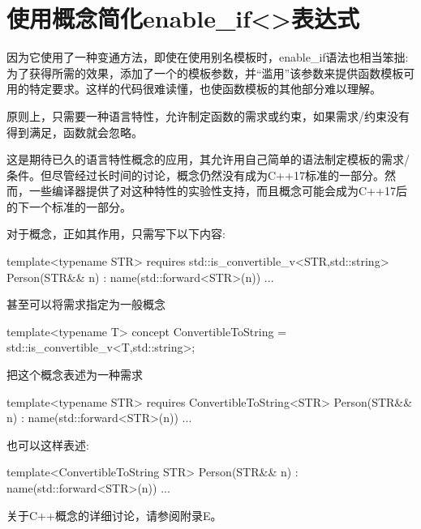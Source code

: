 \section{使用概念简化enable\_if<>表达式}
因为它使用了一种变通方法，即使在使用别名模板时，enable\_if语法也相当笨拙:为了获得所需的效果，添加了一个的模板参数，并“滥用”该参数来提供函数模板可用的特定要求。这样的代码很难读懂，也使函数模板的其他部分难以理解。

原则上，只需要一种语言特性，允许制定函数的需求或约束，如果需求/约束没有得到满足，函数就会忽略。

这是期待已久的语言特性概念的应用，其允许用自己简单的语法制定模板的需求/条件。但尽管经过长时间的讨论，概念仍然没有成为C++17标准的一部分。然而，一些编译器提供了对这种特性的实验性支持，而且概念可能会成为C++17后的下一个标准的一部分。

对于概念，正如其作用，只需写下以下内容:

\begin{cpp}
template<typename STR>
requires std::is_convertible_v<STR,std::string>
Person(STR&& n) : name(std::forward<STR>(n)) {
	...
}
\end{cpp}

甚至可以将需求指定为一般概念

\begin{cpp}
template<typename T>
concept ConvertibleToString = std::is_convertible_v<T,std::string>;
\end{cpp}

把这个概念表述为一种需求

\begin{cpp}
template<typename STR>
requires ConvertibleToString<STR>
Person(STR&& n) : name(std::forward<STR>(n)) {
	...
}
\end{cpp}

也可以这样表述:

\begin{cpp}
template<ConvertibleToString STR>
Person(STR&& n) : name(std::forward<STR>(n)) {
	...
}
\end{cpp}

关于C++概念的详细讨论，请参阅附录E。




















